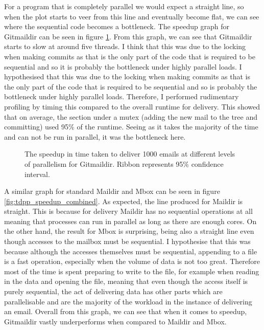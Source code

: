 For a program that is completely parallel we would expect a straight line, so when the plot starts to veer from this line and eventually become flat, we can see where the sequential code becomes a bottleneck. The speedup graph for Gitmaildir can be seen in figure \ref{fig:tdpp_speedup}. From this graph, we can see that Gitmaildir starts to slow at around five threads. I think that this was due to the locking when making commits as that is the only part of the code that is required to be sequential and so it is probably the bottleneck under highly parallel loads.
I hypothesised that this was due to the locking when making commits as that is the only part of the code that is required to be sequential and so is probably the bottleneck under highly parallel loads. Therefore, I performed rudimentary profiling by timing this compared to the overall runtime for delivery. This showed that on average, the section under a mutex (adding the new mail to the tree and committing) used 95\% of the runtime. Seeing as it takes the majority of the time and can not be run in parallel, it was the bottleneck here.

\begin{figure}[h]
    \centering
    
    \caption{The speedup in time taken to deliver 1000 emails at different levels of parallelism for Gitmaildir. Ribbon represents 95\% confidence interval.}
    \label{fig:tdpp_speedup}
\end{figure}

A similar graph for standard Maildir and Mbox can be seen in figure \ref{fig:tdpp_speedup_combined}. As expected, the line produced for Maildir is straight. This is because for delivery Maildir has no sequential operations at all meaning that processes can run in parallel as long as there are enough cores. On the other hand, the result for Mbox is surprising, being also a straight line even though accesses to the mailbox must be sequential. I hypothesise that this was because although the accesses themselves must be sequential, appending to a file is a fast operation, especially when the volume of data is not too great. Therefore most of the time is spent preparing to write to the file, for example when reading in the data and opening the file, meaning that even though the access itself is purely sequential, the act of delivering data has other parts which are parallelisable and are the majority of the workload in the instance of delivering an email. Overall from this graph, we can see that when it comes to speedup, Gitmaildir vastly underperforms when compared to Maildir and Mbox.

